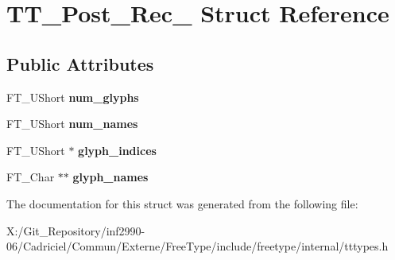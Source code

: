 \hypertarget{struct_t_t___post__20_rec__}{\section{T\-T\-\_\-\-Post\-\_\-Rec\-\_\- Struct Reference}
\label{struct_t_t___post__20_rec__}
}
\subsection*{Public Attributes}
\begin{DoxyCompactItemize}
\item 
\hypertarget{struct_t_t___post__20_rec___ae3de3677810e6581f2c197e8fa902979}{F\-T\-\_\-\-U\-Short {\bfseries num\-\_\-glyphs}}\label{struct_t_t___post__20_rec___ae3de3677810e6581f2c197e8fa902979}

\item 
\hypertarget{struct_t_t___post__20_rec___af726ff4997521c76de36f76e1203e2b1}{F\-T\-\_\-\-U\-Short {\bfseries num\-\_\-names}}\label{struct_t_t___post__20_rec___af726ff4997521c76de36f76e1203e2b1}

\item 
\hypertarget{struct_t_t___post__20_rec___a7f0a07ab96ccbe2597378f7aa2de3f8c}{F\-T\-\_\-\-U\-Short $\ast$ {\bfseries glyph\-\_\-indices}}\label{struct_t_t___post__20_rec___a7f0a07ab96ccbe2597378f7aa2de3f8c}

\item 
\hypertarget{struct_t_t___post__20_rec___a8330fbc7db3659ac621e98d7ceb8aad3}{F\-T\-\_\-\-Char $\ast$$\ast$ {\bfseries glyph\-\_\-names}}\label{struct_t_t___post__20_rec___a8330fbc7db3659ac621e98d7ceb8aad3}

\end{DoxyCompactItemize}


The documentation for this struct was generated from the following file\-:\begin{DoxyCompactItemize}
\item 
X\-:/\-Git\-\_\-\-Repository/inf2990-\/06/\-Cadriciel/\-Commun/\-Externe/\-Free\-Type/include/freetype/internal/tttypes.\-h\end{DoxyCompactItemize}
